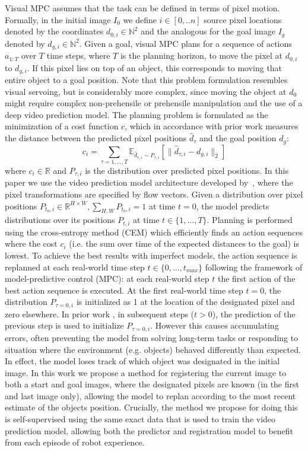 Visual MPC assumes that the task can be defined in terms of pixel motion. Formally, in the initial image $I_0$ we define $i \in [0,..n]$ source pixel locations denoted by the coordinates $d_{0,i} \in \mathbb{N}^2$ and the analogous for the goal image $I_g$ denoted by $d_{g,i} \in \mathbb{N}^2$. Given a goal, visual MPC plans for a sequence of actions $a_{1:T}$ over $T$ time steps, where $T$ is the planning horizon, to move the pixel at $d_{0,i}$ to $d_{g,i}$. If this pixel lies on top of an object, this corresponds to moving that entire object to a goal position. Note that this problem formulation resembles visual servoing, but is considerably more complex, since moving the object at $d_0$ might require complex non-prehensile or prehensile manipulation and the use of a deep video prediction model.
The planning problem is formulated as the minimization of a cost function $c$, which in accordance with prior work \cite{sna} measures the distance between the predicted pixel positions $\hat{d}_{\tau}$ and the goal position $d_g$:
\begin{equation}
c_i  = \sum_{\tau = 1, \dots, T} \mathbb{E}_{\hat{d}_{\tau,i} \sim P_{\tau,i}} \left[\|\hat{d}_{\tau,i} - d_{g,i}\|_2\right]  
\label{eq:cost}
\end{equation}
where $c_i \in \mathbb{R}$ and $P_{\tau,i}$ is the distribution over predicted pixel positions. In this paper we use the video prediction model architecture developed by~\citet{savp}, where the pixel transformations are specified by flow vectors.
Given a distribution over pixel positions \mbox{$P_{t_0,i}\in\mathbb{R}^{H\times W}, \sum_{H,W} P_{t_0,i} = 1$} at time $t = 0$, the model predicts distributions over its positions $P_{t,i}$ at time $t \in \{ 1, \dots, T \}$. Planning is performed using the cross-entropy method (CEM) \cite{cem-rk-13} which efficiently finds an action sequences where the cost $c_i$ (i.e. the sum over time of the expected distances to the goal) is lowest.
To achieve the best results with imperfect models, the action sequence is replanned at each real-world time step $t \in \{0,...,t_{max}\}$ following the framework of model-predictive control (MPC): at each real-world step $t$ the first action of the best action sequence is executed. 
At the first real-world time step $t=0$, the distribution $P_{\tau=0,i}$ is initialized as 1 at the location of the designated pixel and zero elsewhere. In prior work \cite{sna, foresight}, in subsequent steps ($t > 0$),  the prediction of the previous step is used to initialize $P_{\tau=0,i}$. However this causes accumulating errors, often preventing the model from solving long-term tasks or responding to situation where the environment (e.g. objects) behaved differently than expected. In effect, the model loses track of which object was designated in the initial image. In this work we propose a method for registering the current image to both a start and goal images, where the designated pixels are known (in the first and last image only), allowing the model to replan according to the most recent estimate of the objects position. Crucially, the method we propose for doing this is self-supervised using the same exact data that is used to train the video prediction model, allowing both the predictor and registration model to benefit from each episode of robot experience.




